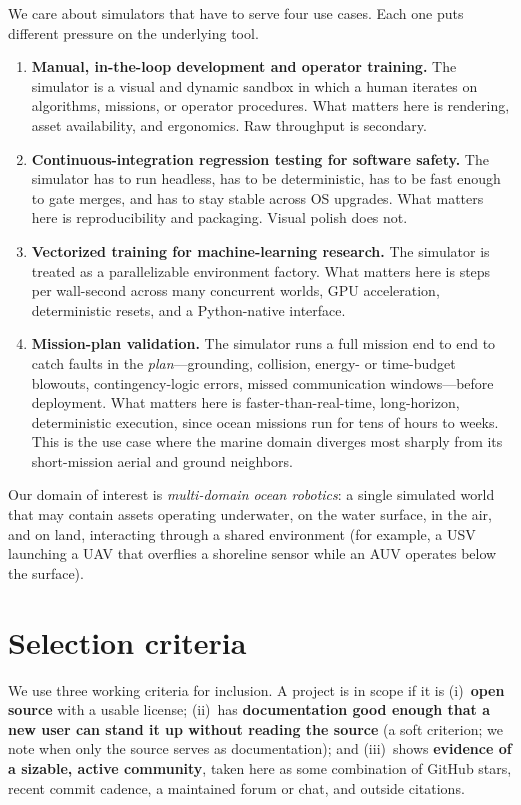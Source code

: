 \documentclass[11pt]{article}
\begin{document}
We care about simulators that have to serve four use cases. Each one puts different pressure on the underlying tool.

\begin{enumerate}[leftmargin=*]
  \item \textbf{Manual, in-the-loop development and operator training.} The simulator is a visual and dynamic sandbox in which a human iterates on algorithms, missions, or operator procedures. What matters here is rendering, asset availability, and ergonomics. Raw throughput is secondary.
  \item \textbf{Continuous-integration regression testing for software safety.} The simulator has to run headless, has to be deterministic, has to be fast enough to gate merges, and has to stay stable across OS upgrades. What matters here is reproducibility and packaging. Visual polish does not.
  \item \textbf{Vectorized training for machine-learning research.} The simulator is treated as a parallelizable environment factory. What matters here is steps per wall-second across many concurrent worlds, GPU acceleration, deterministic resets, and a Python-native interface.
  \item \textbf{Mission-plan validation.} The simulator runs a full mission end to end to catch faults in the \emph{plan}---grounding, collision, energy- or time-budget blowouts, contingency-logic errors, missed communication windows---before deployment. What matters here is faster-than-real-time, long-horizon, deterministic execution, since ocean missions run for tens of hours to weeks. This is the use case where the marine domain diverges most sharply from its short-mission aerial and ground neighbors.
\end{enumerate}

Our domain of interest is \emph{multi-domain ocean robotics}: a single simulated world that may contain assets operating underwater, on the water surface, in the air, and on land, interacting through a shared environment (for example, a USV launching a UAV that overflies a shoreline sensor while an AUV operates below the surface).

\section{Selection criteria}
\label{sec:criteria}

We use three working criteria for inclusion. A project is in scope if it is (i)~\textbf{open source} with a usable license; (ii)~has \textbf{documentation good enough that a new user can stand it up without reading the source} (a soft criterion; we note when only the source serves as documentation); and (iii)~shows \textbf{evidence of a sizable, active community}, taken here as some combination of GitHub stars, recent commit cadence, a maintained forum or chat, and outside citations.
\end{document}
